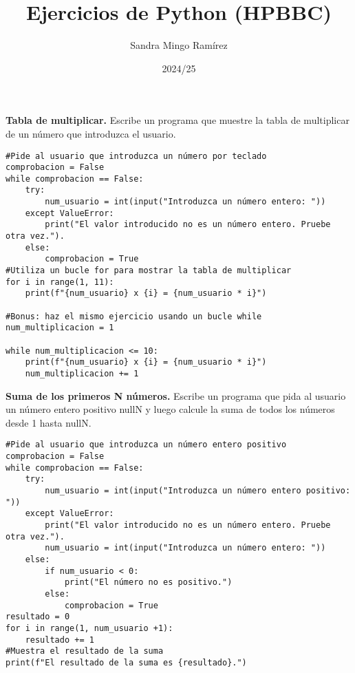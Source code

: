 \documentclass{config/ejercicios}
\title{Ejercicios de Python (HPBBC)}
\author{Sandra Mingo Ramírez}
\date{2024/25}
\begin{document}
\maketitle

\begin{problemS} \textbf{Tabla de multiplicar.}
Escribe un programa que muestre la tabla de multiplicar de un número que introduzca el usuario.
\begin{lstlisting}
#Pide al usuario que introduzca un número por teclado
comprobacion = False
while comprobacion == False:
	try:
		num_usuario = int(input("Introduzca un número entero: "))
	except ValueError:
		print("El valor introducido no es un número entero. Pruebe otra vez.").
	else:
		comprobacion = True
#Utiliza un bucle for para mostrar la tabla de multiplicar
for i in range(1, 11):
	print(f"{num_usuario} x {i} = {num_usuario * i}")
	
#Bonus: haz el mismo ejercicio usando un bucle while
num_multiplicacion = 1

while num_multiplicacion <= 10:
	print(f"{num_usuario} x {i} = {num_usuario * i}")
	num_multiplicacion += 1
\end{lstlisting}
\end{problemS}

\begin{problemS} \textbf{Suma de los primeros N números.}
Escribe un programa que pida al usuario un número entero positivo nullN y luego calcule la suma de todos los números desde 1 hasta nullN.
\begin{lstlisting}
#Pide al usuario que introduzca un número entero positivo
comprobacion = False
while comprobacion == False:
	try:
		num_usuario = int(input("Introduzca un número entero positivo: "))
	except ValueError:
		print("El valor introducido no es un número entero. Pruebe otra vez.").
		num_usuario = int(input("Introduzca un número entero: "))
	else:
		if num_usuario < 0:
			print("El número no es positivo.")
		else:
			comprobacion = True
resultado = 0
for i in range(1, num_usuario +1):
	resultado += 1
#Muestra el resultado de la suma
print(f"El resultado de la suma es {resultado}.")
\end{lstlisting}
\end{problemS}
\end{document}
